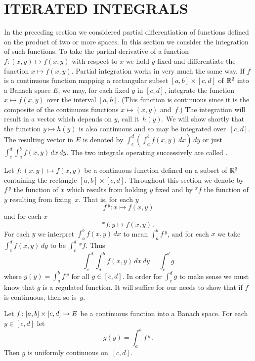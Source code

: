 \section{ITERATED INTEGRALS}
In the preceding section we considered partial differentiation of functions defined on the
product of two or more spaces.  In this section we consider the integration of such functions.
To take the partial derivative of a function $f\colon (x,y) \mapsto f(x,y)$ with respect to
$x$ we hold $y$ fixed and differentiate the function $x \mapsto f(x,y)$.  Partial integration
works in very much the same way.  If $f$ is a continuous function mapping a rectangular subset
$[a,b]\times [c,d]$ of $\mathbb{R}^2$ into a Banach space $E$, we may, for each fixed $y$ in $[c,d]$,
integrate the function $x \mapsto f(x,y)$ over the interval $[a,b]$. (This function is
continuous since it is the composite of the continuous functions $x \mapsto (x,y)$ and~$f$.)
The integration will result in a vector which depends on $y$, call it~$h(y)$.  We will show
shortly that the function $y \mapsto h(y)$ is also continuous and so may be integrated
over~$[c,d]$.  The resulting vector in $E$ is denoted by $\int_c^d\left(\int_a^b
f(x,y)\,dx\right)\,dy$ or just $\int_c^d\int_a^b f(x,y)\,dx\,dy$.  The two integrals operating
successively are called
.


\begin{notn} Let $f \colon (x,y) \mapsto f(x,y)$ be a continuous function defined on a subset
of $\mathbb{R}^2$ containing the rectangle $[a,b] \times [c,d]$.  Throughout this section we denote by
$f\,^y$ the function of $x$ which results from holding $y$ fixed and by ${}^xf$ the function
of $y$ resulting from fixing~$x$.  That is, for each $y$
  \[ f\,^y \colon x \mapsto f(x,y) \]
and for each $x$
  \[ {}^xf\colon y\mapsto f(x,y)\,. \]
For each $y$ we interpret  $\int_a^b f(x,y)\,dx$ to mean $\int_a^b f\,^y$, and for each $x$ we
take $\int_c^d f(x,y)\,dy$ to be $\int_c^d\, {}^xf$.  Thus
  \[ \int_c^d\int_a^b f(x,y)\,dx\,dy = \int_c^d g \]
where $g(y) = \int_a^b f\,^y$ for all $y \in [c,d]$.  In order for $\int_c^d g$ to make sense
we must know that $g$ is a regulated function.  It will suffice for our needs to show that if
$f$ is continuous, then so is~$g$.
\end{notn}

\begin{lem}\label{lem_int_2cont}  Let $f \colon [a,b] \times [c,d] \rightarrow E$ be a continuous
function into a Banach space.  For each $y \in [c,d]$ let
  \[ g(y) = \int_a^b f\,^y\,. \]
Then $g$ is uniformly continuous on~$[c,d]$.
\end{lem}

